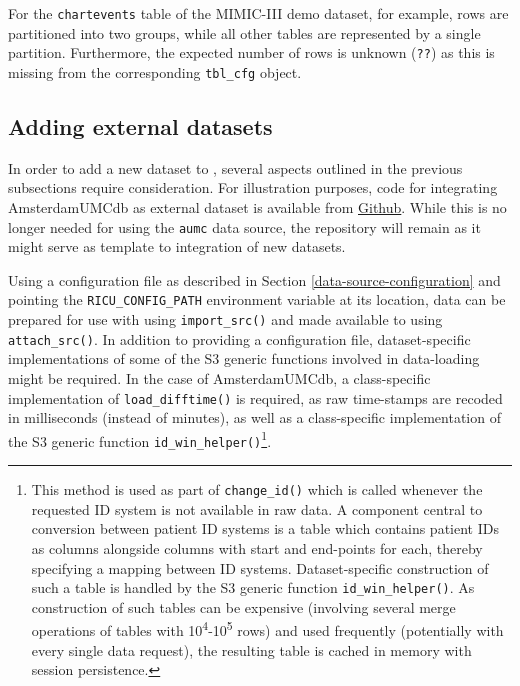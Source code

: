 \documentclass[
]{jss}
\begin{document}
For the \texttt{chartevents} table of the MIMIC-III demo dataset, for
example, rows are partitioned into two groups, while all other tables
are represented by a single partition. Furthermore, the expected number
of rows is unknown (\texttt{??}) as this is missing from the
corresponding \texttt{tbl\_cfg} object.

\hypertarget{adding-external-datasets}{%
\subsection{Adding external datasets}\label{adding-external-datasets}}

In order to add a new dataset to , several aspects outlined in
the previous subsections require consideration. For illustration
purposes, code for integrating AmsterdamUMCdb as external dataset is
available from \href{https://github.com/eth-mds/aumc}{Github}. While
this is no longer needed for using the \texttt{aumc} data source, the
repository will remain as it might serve as template to integration of
new datasets.

Using a configuration file as described in Section
\ref{data-source-configuration} and pointing the
\texttt{RICU\_CONFIG\_PATH} environment variable at its location, data
can be prepared for use with  using \texttt{import\_src()} and
made available to  using \texttt{attach\_src()}. In addition
to providing a configuration file, dataset-specific implementations of
some of the S3 generic functions involved in data-loading might be
required. In the case of AmsterdamUMCdb, a class-specific implementation
of \texttt{load\_difftime()} is required, as raw time-stamps are recoded
in milliseconds (instead of minutes), as well as a class-specific
implementation of the S3 generic function
\texttt{id\_win\_helper()}\footnote{This method is used as part of
  \texttt{change\_id()} which is called whenever the requested ID system
  is not available in raw data. A component central to conversion
  between patient ID systems is a table which contains patient IDs as
  columns alongside columns with start and end-points for each, thereby
  specifying a mapping between ID systems. Dataset-specific construction
  of such a table is handled by the S3 generic function
  \texttt{id\_win\_helper()}. As construction of such tables can be
  expensive (involving several merge operations of tables with
  10\textsuperscript{4}-10\textsuperscript{5} rows) and used frequently
  (potentially with every single data request), the resulting table is
  cached in memory with session persistence.}.
\end{document}
